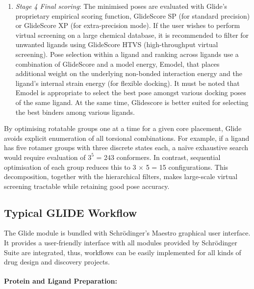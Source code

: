 \documentclass[12pt]{article}
\begin{document}
\begin{enumerate}
  \item \emph{Stage 4 Final scoring}: The minimised poses are evaluated with Glide's proprietary empirical scoring function, GlideScore SP (for standard precision) or GlideScore XP (for extra-precision mode). If the user wishes to perform virtual screening on a large chemical database, it is recommended to filter for unwanted ligands using GlideScore HTVS (high-throughput virtual screening). Pose selection within a ligand and ranking across ligands use a combination of GlideScore and a model energy, Emodel, that places additional weight on the underlying non-bonded interaction energy and the ligand's internal strain energy (for flexible docking). It must be noted that Emodel is appropriate to select the best pose amongst various docking poses of the same ligand. At the same time, Glidescore is better suited for selecting the best binders among various ligands. 
\end{enumerate}

By optimising rotatable groups one at a time for a given core placement, Glide avoids explicit enumeration of all torsional combinations. For example, if a ligand has five rotamer groups with three discrete states each, a naïve exhaustive search would require evaluation of $3^5$ = 243 conformers. In contrast, sequential optimisation of each group reduces this to 3 $\times$ 5 = 15 configurations. This decomposition, together with the hierarchical filters, makes large-scale virtual screening tractable while retaining good pose accuracy.

\subsection{Typical GLIDE Workflow}

The Glide module is bundled with Schr\"{o}dinger's Maestro graphical user interface. It provides a user-friendly interface with all modules provided by  Schr\"{o}dinger Suite are integrated, thus, workflows can be easily implemented for all kinds of drug design and discovery projects. 

\paragraph{Protein and Ligand Preparation:}
\end{document}
